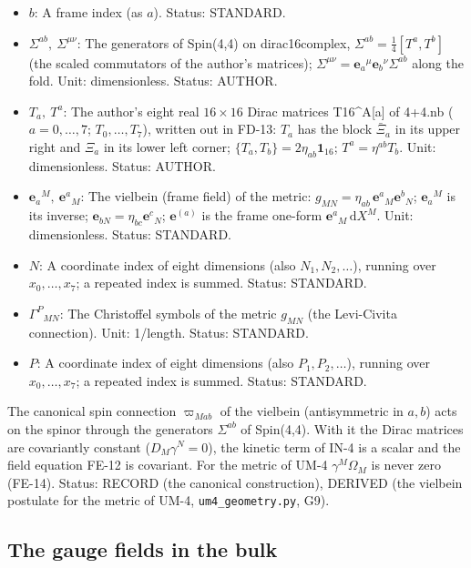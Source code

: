 \documentclass[
  10pt,
]{article}
\begin{document}
\begin{itemize}
  Status: STANDARD.
\item
  \(b\): A frame index (as \(a\)). Status: STANDARD.
\item
  \(\Sigma^{ab},\ \Sigma^{\mu\nu}\): The generators of Spin(4,4) on
  dirac16complex, \(\Sigma^{ab} = \frac14[T^a, T^b]\) (the scaled
  commutators of the author's matrices);
  \(\Sigma^{\mu\nu} = \mathbf{e}_a{}^\mu\mathbf{e}_b{}^\nu\Sigma^{ab}\)
  along the fold. Unit: dimensionless. Status: AUTHOR.
\item
  \(T_a,\ T^a\): The author's eight real \(16 \times 16\) Dirac matrices
  T16\^{}A{[}a{]} of 4+4.nb (\(a = 0, \dots, 7\); \(T_0, \dots, T_7\)),
  written out in FD-13: \(T_a\) has the block \(\bar\Xi_a\) in its upper
  right and \(\Xi_a\) in its lower left corner;
  \(\{T_a, T_b\} = 2\eta_{ab}\mathbf{1}_{16}\); \(T^a = \eta^{ab}T_b\).
  Unit: dimensionless. Status: AUTHOR.
\item
  \(\mathbf{e}_a{}^M,\ \mathbf{e}^a{}_M\): The vielbein (frame field) of
  the metric: \(g_{MN} = \eta_{ab}\,\mathbf{e}^a{}_M\mathbf{e}^b{}_N\);
  \(\mathbf{e}_a{}^M\) is its inverse;
  \(\mathbf{e}_{bN} = \eta_{bc}\mathbf{e}^c{}_N\); \(\mathbf{e}^{(a)}\)
  is the frame one-form \(\mathbf{e}^a{}_M\,\mathrm{d}X^M\). Unit:
  dimensionless. Status: STANDARD.
\item
  \(N\): A coordinate index of eight dimensions (also
  \(N_1, N_2, \dots\)), running over \(x_0, \dots, x_7\); a repeated
  index is summed. Status: STANDARD.
\item
  \(\Gamma^P{}_{MN}\): The Christoffel symbols of the metric \(g_{MN}\)
  (the Levi-Civita connection). Unit: 1/length. Status: STANDARD.
\item
  \(P\): A coordinate index of eight dimensions (also
  \(P_1, P_2, \dots\)), running over \(x_0, \dots, x_7\); a repeated
  index is summed. Status: STANDARD.
\end{itemize}

The canonical spin connection \(\varpi_{Mab}\) of the vielbein
(antisymmetric in \(a, b\)) acts on the spinor through the generators
\(\Sigma^{ab}\) of Spin(4,4). With it the Dirac matrices are covariantly
constant (\(D_M\gamma^N = 0\)), the kinetic term of IN-4 is a scalar and
the field equation FE-12 is covariant. For the metric of UM-4
\(\gamma^M\Omega_M\) is never zero (FE-14). Status: RECORD (the
canonical construction), DERIVED (the vielbein postulate for the metric
of UM-4, \texttt{um4\_geometry.py}, G9).

\hypertarget{the-gauge-fields-in-the-bulk}{%
\subsection{The gauge fields in the
bulk}\label{the-gauge-fields-in-the-bulk}}
\end{document}
